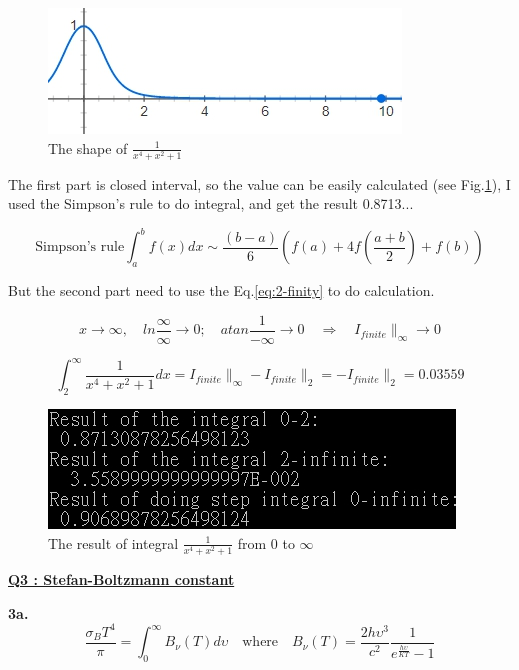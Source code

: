 \documentclass{article}
\begin{document}
\begin{figure}[h]
    \centering 
	\includegraphics[scale=0.55]{pro2-1.jpg}
	\caption{The shape of $\frac{1}{x^4+x^2+1}$ }
	\label{fig:2-1} %
\end{figure}

The first part is closed interval, so the value can be easily calculated (see Fig.\ref{fig:2-1}), I used the Simpson's rule to do integral, and get the result 0.8713...

\begin{equation}
\mbox{Simpson's rule}
\int_{a}^{b}f(x)dx\sim \frac{(b-a)}{6}(f(a)+4f(\frac{a+b}{2})+f(b))
\end{equation}

But the second part need to use the Eq.\ref{eq:2-finity} to do calculation.

$$ x \rightarrow  \infty,\quad ln\frac{\infty}{\infty} \rightarrow 0;\quad atan\frac{1}{-\infty}\rightarrow  0\quad \Rightarrow \quad I_{finite}\|_{\infty}\rightarrow  0$$

$$
\int_2^\infty \frac{1}{x^4+x^2+1}dx
=
I_{finite}\|_{\infty}-I_{finite}\|_{2}=-I_{finite}\|_{2}=0.03559
$$

\begin{figure}[h]
    \centering 
	\includegraphics[scale=0.55]{pro2-2.jpg}
	\caption{The result of integral $\frac{1}{x^4+x^2+1}$ from 0 to $\infty$ }
	\label{fig:2-2} %
\end{figure}


\underline{\textbf{Q3 : Stefan-Boltzmann constant}}

\textbf{3a.}
\begin{equation}
    \frac{\sigma _{B}T^{4}}{\pi}=\int_{0}^{\infty }B_{\nu}(T)d\upsilon
    \quad \mbox{where} \quad
    B_{\nu}(T)=\frac{2h\upsilon ^{3}}{c^{2}}\frac{1}{e^{\frac{h\upsilon }{KT}}-1}
    \label{eq:3-1}
\end{equation}
\end{document}
